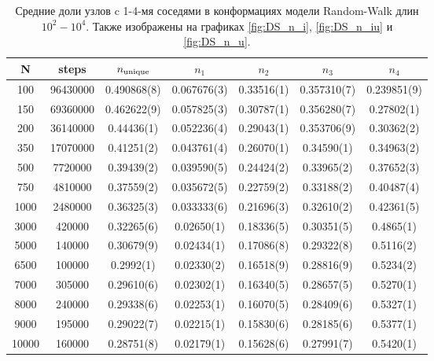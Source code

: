 \begin{table}[h]
    \centering

\begin{tabular}{|c|c|c|c|c|c|c|}
\hline
N & steps & $ n_{\textup{unique}} $ & $n_{1}$ & $n_{2}$ & $n_{3}$ & $n_{4}$ \\ \hline
100 & 96430000 & 0.490868(8) & 0.067676(3) & 0.33516(1) & 0.357310(7) & 0.239851(9) \\ \hline
150 & 69360000 & 0.462622(9) & 0.057825(3) & 0.30787(1) & 0.356280(7) & 0.27802(1) \\ \hline
200 & 36140000 & 0.44436(1) & 0.052236(4) & 0.29043(1) & 0.353706(9) & 0.30362(2) \\ \hline
350 & 17070000 & 0.41251(2) & 0.043761(4) & 0.26070(1) & 0.34590(1) & 0.34963(2) \\ \hline
500 & 7720000 & 0.39439(2) & 0.039590(5) & 0.24424(2) & 0.33965(2) & 0.37652(3) \\ \hline
750 & 4810000 & 0.37559(2) & 0.035672(5) & 0.22759(2) & 0.33188(2) & 0.40487(4) \\ \hline 
1000 & 2480000 & 0.36325(3) & 0.033333(6) & 0.21696(3) & 0.32610(2) & 0.42361(5) \\ \hline
3000 & 420000 & 0.32265(6) & 0.02650(1) & 0.18336(5) & 0.30351(5) & 0.4865(1) \\ \hline
5000 & 140000 & 0.30679(9) & 0.02434(1) & 0.17086(8) & 0.29322(8) & 0.5116(2) \\ \hline
6500 & 100000 & 0.2992(1) & 0.02330(2) & 0.16518(9) & 0.28816(9) & 0.5234(2) \\ \hline
7000 & 305000 & 0.29610(6) & 0.02302(1) & 0.16340(5) & 0.28657(5) & 0.5270(1) \\ \hline
8000 & 240000 & 0.29338(6) & 0.02253(1) & 0.16070(5) & 0.28409(6) & 0.5327(1) \\ \hline
9000 & 195000 & 0.29022(7) & 0.02215(1) & 0.15830(6) & 0.28185(6) & 0.5377(1) \\ \hline
10000 & 160000 & 0.28751(8) & 0.02179(1) & 0.15628(6) & 0.27991(7) & 0.5420(1) \\ \hline
\end{tabular}

    \caption{Средние доли узлов c 1-4-мя соседями в конформациях модели Random-Walk длин $10^{2}-10^{4}$. Также изображены на графиках \ref{fig:DS_n_i}, \ref{fig:DS_n_iu} и \ref{fig:DS_n_u}.}
    \label{tab:Ran_Walk_neigh}
\end{table}

